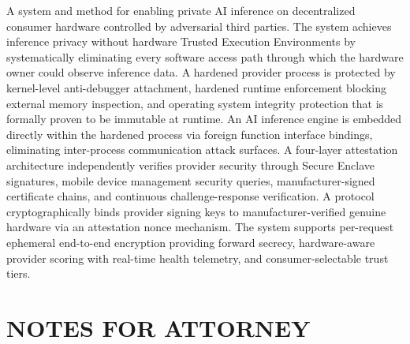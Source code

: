 \documentclass[11pt,letterpaper]{article}
\begin{document}
A system and method for enabling private AI inference on decentralized consumer hardware controlled by adversarial third parties. The system achieves inference privacy without hardware Trusted Execution Environments by systematically eliminating every software access path through which the hardware owner could observe inference data. A hardened provider process is protected by kernel-level anti-debugger attachment, hardened runtime enforcement blocking external memory inspection, and operating system integrity protection that is formally proven to be immutable at runtime. An AI inference engine is embedded directly within the hardened process via foreign function interface bindings, eliminating inter-process communication attack surfaces. A four-layer attestation architecture independently verifies provider security through Secure Enclave signatures, mobile device management security queries, manufacturer-signed certificate chains, and continuous challenge-response verification. A protocol cryptographically binds provider signing keys to manufacturer-verified genuine hardware via an attestation nonce mechanism. The system supports per-request ephemeral end-to-end encryption providing forward secrecy, hardware-aware provider scoring with real-time health telemetry, and consumer-selectable trust tiers.

\newpage
\section*{NOTES FOR ATTORNEY}
\end{document}
